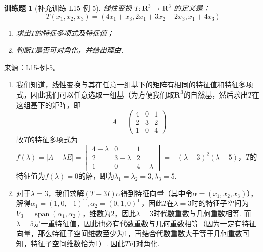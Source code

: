 \documentclass[12pt,fontset=fandol]{ctexart}
\newtheorem{exercise}{训练题}[section]
\begin{document}
\begin{exercise}[补充训练 L15-例-5]\label{prob:L15-例-5}
线性变换 $T : \mathbf{R}^3 \to \mathbf{R}^3$ 的定义是：
    \[T(x_1,x_2,x_3)=(4x_1+x_3,2x_1+3x_2+2x_3,x_1+4x_3)\]
    \begin{enumerate}
        \item 求出$T$的特征多项式及特征值；

        \item 判断$T$是否可对角化，并给出理由.
    \end{enumerate}
\end{exercise}
\noindent 来源：\href{https://github.com/yhwu-is/Linear-Algebra-Left-Undone/blob/new/%E8%AE%B2%E4%B9%89/%E4%B8%93%E9%A2%98/15%20%E7%9B%B8%E4%BC%BC%E6%A0%87%E5%87%86%E5%BD%A2%EF%BC%9A%E5%A4%8D%E6%95%B0%E5%9F%9F%E4%B8%8A%E7%9A%84%E5%B0%9D%E8%AF%95%E4%B8%8E%E7%90%86%E8%AE%BA.tex}{L15-例-5}。
\begin{solve}
\begin{enumerate}
        \item 我们知道，线性变换与其在任意一组基下的矩阵有相同的特征值和特征多项式，因此我们可以任意选取一组基（为方便我们取$\mathbf{R}^3$的自然基，然后求出$T$在这组基下的矩阵，即
              \[A=\begin{pmatrix}
                      4 & 0 & 1 \\
                      2 & 3 & 2 \\
                      1 & 0 & 4
                  \end{pmatrix}\]
              故$T$的特征多项式为$f(\lambda)=|A-\lambda E|=\begin{vmatrix}
                      4-\lambda & 0         & 1         \\
                      2         & 3-\lambda & 2         \\
                      1         & 0         & 4-\lambda
                  \end{vmatrix}=-(\lambda-3)^2(\lambda-5)$，$T$的特征值为$f(\lambda)=0$的解，即为$\lambda_1=\lambda_2=3,\lambda_3=5$.

        \item 对于$\lambda=3$，我们求解$(T-3I)\alpha$得到特征向量（其中令$\alpha=(x_1,x_2,x_3)$），解得$\alpha_1=(1,0,-1)^\mathrm{T},\alpha_2=(0,1,0)^\mathrm{T}$，因此$T$在$\lambda=3$时的特征子空间为$V_3=\operatorname{span}(\alpha_1,\alpha_2)$，维数为2，因此$\lambda=3$时代数重数与几何重数相等. 而$\lambda=5$是一重特征值，因此也必有代数重数与几何重数相等（因为一定有特征向量，那么特征子空间维数至少为1，再结合代数重数大于等于几何重数可知，特征子空间维数恰为1）. 因此$T$可对角化.
    \end{enumerate}
\end{solve}
\end{document}
